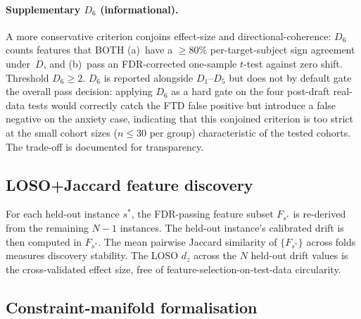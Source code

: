 \documentclass[11pt,a4paper]{article}
\begin{document}
\paragraph{Supplementary $D_6$ (informational).} A more conservative criterion conjoins effect-size and directional-coherence: $D_6$ counts features that BOTH (a)~have a $\geq 80\%$ per-target-subject sign agreement under~$D$, and (b)~pass an FDR-corrected one-sample $t$-test against zero shift. Threshold $D_6 \geq 2$. $D_6$ is reported alongside $D_1$--$D_5$ but does not by default gate the overall pass decision: applying $D_6$ as a hard gate on the four post-draft real-data tests would correctly catch the FTD false positive but introduce a false negative on the anxiety case, indicating that this conjoined criterion is too strict at the small cohort sizes ($n \leq 30$ per group) characteristic of the tested cohorts. The trade-off is documented for transparency.

\subsection{LOSO+Jaccard feature discovery}\label{sec:method-loso}

For each held-out instance $s^*$, the FDR-passing feature subset $F_{s^*}$ is re-derived from the remaining $N-1$ instances. The held-out instance's calibrated drift is then computed in $F_{s^*}$. The mean pairwise Jaccard similarity of $\{F_{s^*}\}$ across folds measures discovery stability. The LOSO $d_z$ across the $N$ held-out drift values is the cross-validated effect size, free of feature-selection-on-test-data circularity.

\subsection{Constraint-manifold formalisation}\label{sec:method-manifold}
\end{document}
